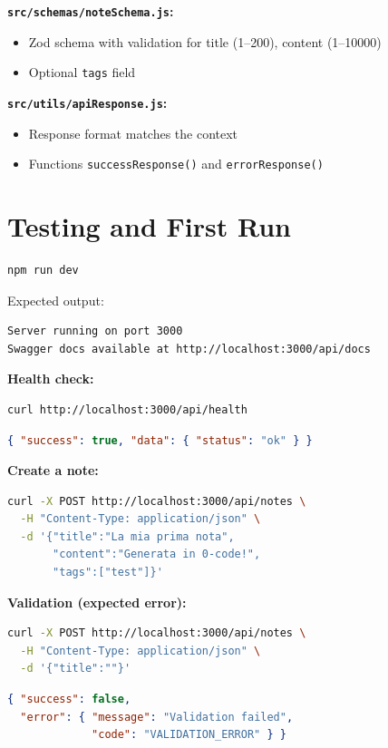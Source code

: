 \textbf{\texttt{src/schemas/noteSchema.js}:}
\begin{itemize}
  \item Zod schema with validation for title (1--200), content (1--10000)
  \item Optional \texttt{tags} field
\end{itemize}

\textbf{\texttt{src/utils/apiResponse.js}:}
\begin{itemize}
  \item Response format matches the context
  \item Functions \texttt{successResponse()} and \texttt{errorResponse()}
\end{itemize}

\section{Testing and First Run}

\begin{praticabox}[title={Hands-on --- Starting the server}]
\begin{lstlisting}[language=bash]
npm run dev
\end{lstlisting}
Expected output:
\begin{lstlisting}[language={}]
Server running on port 3000
Swagger docs available at http://localhost:3000/api/docs
\end{lstlisting}
\end{praticabox}

\begin{praticabox}[title={Hands-on --- Manual tests}]
\textbf{Health check:}
\begin{lstlisting}[language=bash]
curl http://localhost:3000/api/health
\end{lstlisting}
\begin{lstlisting}[language=json]
{ "success": true, "data": { "status": "ok" } }
\end{lstlisting}

\textbf{Create a note:}
\begin{lstlisting}[language=bash]
curl -X POST http://localhost:3000/api/notes \
  -H "Content-Type: application/json" \
  -d '{"title":"La mia prima nota",
       "content":"Generata in 0-code!",
       "tags":["test"]}'
\end{lstlisting}

\textbf{Validation (expected error):}
\begin{lstlisting}[language=bash]
curl -X POST http://localhost:3000/api/notes \
  -H "Content-Type: application/json" \
  -d '{"title":""}'
\end{lstlisting}
\begin{lstlisting}[language=json]
{ "success": false,
  "error": { "message": "Validation failed",
             "code": "VALIDATION_ERROR" } }
\end{lstlisting}
\end{praticabox}

